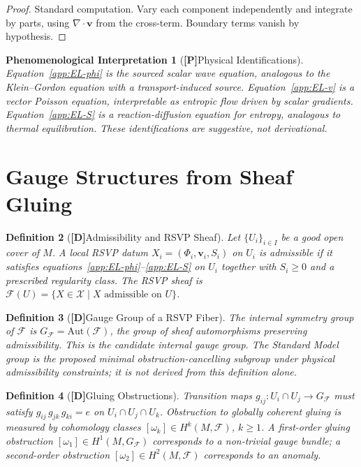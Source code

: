 \documentclass[12pt,a4paper]{article}
\newcommand{\claimD}{\textbf{[D]}\;}
\newcommand{\claimP}{\textbf{[P]}\;}
\newtheorem{defn}{Definition}[section]
\newtheorem{appphen}[defn]{Phenomenological Interpretation}
\begin{document}
\begin{proof}
Standard computation. Vary each component independently and integrate by parts,
using $\nabla\cdot\mathbf{v}$ from the cross-term. Boundary terms vanish by
hypothesis.
\end{proof}

\begin{appphen}[\claimP Physical Identifications]
Equation~\eqref{app:EL-phi} is the sourced scalar wave equation, analogous to
the Klein--Gordon equation with a transport-induced source.
Equation~\eqref{app:EL-v} is a vector Poisson equation, interpretable as
entropic flow driven by scalar gradients. Equation~\eqref{app:EL-S} is a
reaction-diffusion equation for entropy, analogous to thermal equilibration.
These identifications are suggestive, not derivational.
\end{appphen}

\section{Gauge Structures from Sheaf Gluing}

\begin{defn}[\claimD Admissibility and RSVP Sheaf]
Let $\{U_i\}_{i\in I}$ be a good open cover of $M$. A local RSVP datum
$X_i = (\Phi_i, \mathbf{v}_i, S_i)$ on $U_i$ is \emph{admissible} if it
satisfies equations~\eqref{app:EL-phi}--\eqref{app:EL-S} on $U_i$ together
with $S_i \geq 0$ and a prescribed regularity class. The RSVP sheaf is
$\mathcal{F}(U) = \{X\in\mathcal{X}\mid X \text{ admissible on }U\}$.
\end{defn}

\begin{defn}[\claimD Gauge Group of a RSVP Fiber]
The \emph{internal symmetry group} of $\mathcal{F}$ is
$G_{\mathcal{F}} = \mathrm{Aut}(\mathcal{F})$,
the group of sheaf automorphisms preserving admissibility. This is the candidate
internal gauge group. The Standard Model group is the proposed minimal
obstruction-cancelling subgroup under physical admissibility constraints; it is
not derived from this definition alone.
\end{defn}

\begin{defn}[\claimD Gluing Obstructions]
Transition maps $g_{ij}: U_i\cap U_j\to G_{\mathcal{F}}$ must satisfy
$g_{ij}\,g_{jk}\,g_{ki} = e$ on $U_i\cap U_j\cap U_k$.
Obstruction to globally coherent gluing is measured by cohomology classes
$[\omega_k] \in H^k(M,\mathcal{F})$, $k\geq 1$.
A first-order gluing obstruction $[\omega_1]\in H^1(M,G_{\mathcal{F}})$
corresponds to a non-trivial gauge bundle; a second-order obstruction
$[\omega_2]\in H^2(M,\mathcal{F})$ corresponds to an anomaly.
\end{defn}
\end{document}
